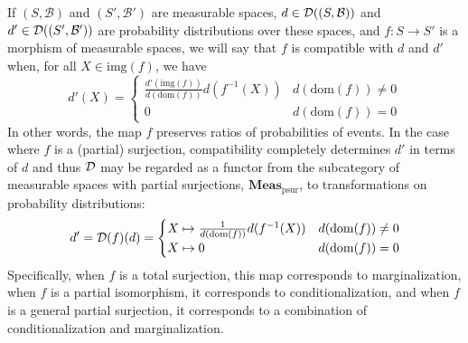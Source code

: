 If $(S, \mathcal{B})$ and $(S',\mathcal{B}')$ are measurable spaces, $d \in \mathcal{D}((S,\mathcal{B}))$ and $d' \in \mathcal{D}((S',\mathcal{B}'))$ are probability distributions over these spaces, and $f \colon S \to S'$ is a morphism of measurable spaces, we will say that $f$ is compatible with $d$ and $d'$ when, for all $X \in \mathrm{img}(f)$, we have
\begin{equation}
 d'(X) =
  \begin{cases}
    \frac{d'(\mathrm{img}(f))}{d(\mathrm{dom}(f))}d(f^{-1}(X)) & d(\mathrm{dom}(f)) \neq 0 \\
    0 & d(\mathrm{dom}(f)) = 0
  \end{cases}
\end{equation}
In other words, the map $f$ preserves ratios of probabilities of events.  In the case where $f$ is a (partial) surjection, compatibility completely determines $d'$ in terms of $d$ and thus $\mathcal{D}$ may be regarded as a functor from the subcategory of measurable spaces with partial surjections, $\mathbf{Meas}_\mathrm{psur}$, to transformations on probability distributions:
\begin{equation}\label{eq:distfunctor}
 d' = \mathcal{D}(f)(d) =
  \begin{cases}
    X \mapsto \frac{1}{d(\mathrm{dom}(f))}d(f^{-1}(X)) & d(\mathrm{dom}(f)) \neq 0 \\
    X \mapsto 0 & d(\mathrm{dom}(f)) = 0
  \end{cases}
\end{equation}
Specifically, when $f$ is a total surjection, this map corresponds to marginalization, when $f$ is a partial isomorphism, it corresponds to conditionalization, and when $f$ is a general partial surjection, it corresponds to a combination of conditionalization and marginalization.

